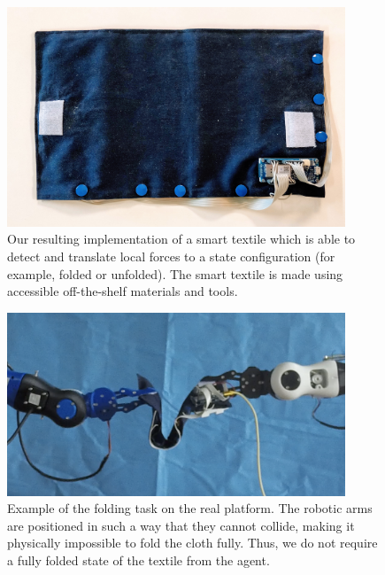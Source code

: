 \documentclass[\home/main.tex]{subfiles}
\begin{document}
\begin{figure}[H]
\centering
\includegraphics[width=0.90\textwidth, keepaspectratio]{figures/textile.jpg}
\caption{Our resulting implementation of a smart textile which is able to detect and translate local forces to a state configuration (for example, folded or unfolded). The smart textile is made using accessible off-the-shelf materials and tools.}
\label{fig:textile_real}
\end{figure}
\unskip

\begin{figure}[H]
\centering
\includegraphics[width=0.90\textwidth, keepaspectratio]{figures/folded_real.png}
\caption{Example of the folding task on the real platform. The robotic arms are positioned in such a way that they cannot collide, making it physically impossible to fold the cloth fully. Thus, we do not require a fully folded state of the textile from the agent.}
\label{fig:folded_real}
\end{figure}
\unskip
\end{document}
